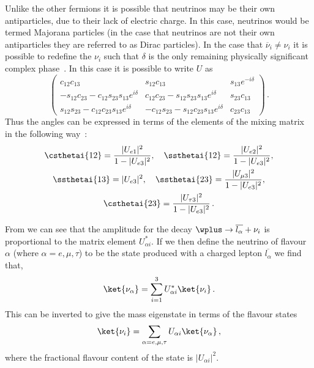 Unlike the other fermions it is possible that neutrinos may be their own antiparticles, due to their lack of electric charge.
In this case, neutrinos would be termed Majorana particles (in the case that neutrinos are not their own antiparticles they are referred to as Dirac particles).
In the case that $\overline{\nu}_{i} \neq \nu_{i}$ it is possible to redefine the $\nu_{i}$ such that $\delta$ is the only remaining physically significant complex phase~\cite{cpvMajorana}.
In this case it is possible to write $U$ as
\begin{equation}
  \begin{pmatrix}
    c_{12}c_{13} & s_{12}c_{13} & s_{13} e^{-i\delta} \\
    -s_{12}c_{23}-c_{12}s_{23}s_{13}e^{i\delta} & c_{12}c_{23}-s_{12}s_{23}s_{13}e^{i\delta} & s_{23}c_{13} \\
    s_{12}s_{23}-c_{12}c_{23}s_{13}e^{i\delta} & -c_{12}s_{23}-s_{12}c_{23}s_{13}e^{i\delta} & c_{23}c_{13} 
  \end{pmatrix} \, .
\end{equation}
Thus the angles can be expressed in terms of the elements of the mixing matrix in the following way~\cite{pdg2018}:
\begin{gather*}
  \csthetai{12} = \frac{|U_{e1}|^{2}}{1 - |U_{e3}|^{2}}, \quad \ssthetai{12} = \frac{|U_{e2}|^{2}}{1 - |U_{e3}|^{2}}, \\
  \ssthetai{13} = |U_{e3}|^{2}, \quad \ssthetai{23} = \frac{|U_{\mu 3}|^{2}}{1 - |U_{e3}|^{2}}, \\
  \csthetai{23} = \frac{|U_{\tau 3}|^{2}}{1 - |U_{e3}|^{2}} \, .
\end{gather*}

From  we can see that the amplitude for the decay $\wplus \rightarrow \overline{l_{\alpha}} + \nu_{i}$ is proportional to the matrix element $U_{\alpha i}^{*}$.
If we then define the neutrino of flavour $\alpha$ (where $\alpha = e, \mu, \tau$) to be the state produced with a charged lepton $\overline{l_{\alpha}}$ we find that,
\begin{equation}
  \ket{\nu_{\alpha}} = \sum_{i=1}^{3} U^{*}_{\alpha i} \ket{\nu_{i}} \, .
\end{equation}
This can be inverted to give the mass eigenstate in terms of the flavour states
\begin{equation}
  \ket{\nu_{i}} = \sum_{\alpha=e, \mu, \tau} U_{\alpha i} \ket{\nu_{\alpha}} \, ,
\end{equation}
where the fractional flavour content of the state is $|U_{\alpha i}|^{2}$.

